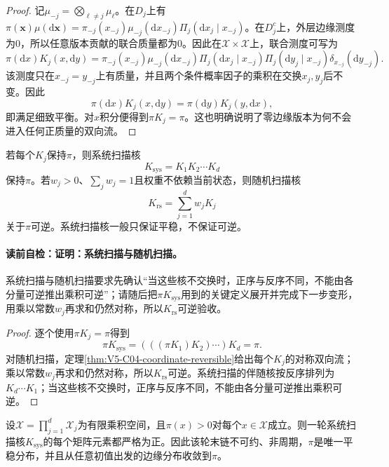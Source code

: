 \begin{proof}
记$\mu_{-j}=\bigotimes_{\ell\ne j}\mu_\ell$。在$D_j$上有$\pi(\boldsymbol x)\mu(\mathrm d\boldsymbol x)=\pi_{-j}(x_{-j})\mu_{-j}(\mathrm dx_{-j})\Pi_j(\mathrm dx_j\mid x_{-j})$。在$D_j^c$上，外层边缘测度为$0$，所以任意版本贡献的联合质量都为$0$。因此在$\mathcal X\times\mathcal X$上，联合测度可写为
\[
\pi(\mathrm dx)K_j(x,\mathrm dy)
=\pi_{-j}(x_{-j})\mu_{-j}(\mathrm dx_{-j})
\Pi_j(\mathrm dx_j\mid x_{-j})
\Pi_j(\mathrm dy_j\mid x_{-j})
\delta_{x_{-j}}(\mathrm dy_{-j}).
\]
该测度只在$x_{-j}=y_{-j}$上有质量，并且两个条件概率因子的乘积在交换$x_j,y_j$后不变。因此
\[
\pi(\mathrm dx)K_j(x,\mathrm dy)
=\pi(\mathrm dy)K_j(y,\mathrm dx),
\]
即满足细致平衡。对$x$积分便得到$\pi K_j=\pi$。这也明确说明了零边缘版本为何不会进入任何正质量的双向流。
\end{proof}

\begin{proposition}[系统扫描与随机扫描]\label{prop:V5-C04-scan-invariance}
若每个$K_j$保持$\pi$，则系统扫描核
\[
K_{\mathrm{sys}}=K_1K_2\cdots K_d
\]
保持$\pi$。若$w_j>0$、$\sum_jw_j=1$且权重不依赖当前状态，则随机扫描核
\[
K_{\mathrm{rs}}=\sum_{j=1}^d w_jK_j
\]
关于$\pi$可逆。系统扫描核一般只保证平稳，不保证可逆。
\end{proposition}
\paragraph{读前自检：证明：系统扫描与随机扫描。}系统扫描与随机扫描要求先确认“当这些核不交换时，正序与反序不同，不能由各分量可逆推出乘积可逆”；请随后把$\pi K_{\mathrm{sys}}$用到的关键定义展开并完成下一步变形，用乘以常数$w_j$再求和仍然对称，所以$K_{\mathrm{rs}}$可逆验收。\par

\begin{proof}
逐个使用$\pi K_j=\pi$得到
\[
\pi K_{\mathrm{sys}}
=(((\pi K_1)K_2)\cdots)K_d=\pi.
\]
对随机扫描，定理\ref{thm:V5-C04-coordinate-reversible}给出每个$K_j$的对称双向流；乘以常数$w_j$再求和仍然对称，所以$K_{\mathrm{rs}}$可逆。系统扫描的伴随核按反序排列为$K_d\cdots K_1$；当这些核不交换时，正序与反序不同，不能由各分量可逆推出乘积可逆。
\end{proof}

\begin{theorem}[有限全支持情形的遍历性]\label{thm:V5-C04-finite-positive}
设$\mathcal X=\prod_{j=1}^d\mathcal X_j$为有限乘积空间，且$\pi(x)>0$对每个$x\in\mathcal X$成立。则一轮系统扫描核$K_{\mathrm{sys}}$的每个矩阵元素都严格为正。因此该轮末链不可约、非周期，$\pi$是唯一平稳分布，并且从任意初值出发的边缘分布收敛到$\pi$。
\end{theorem}
